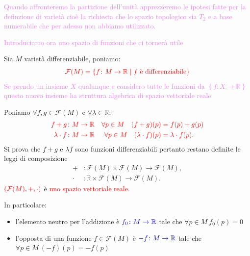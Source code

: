         \textcolor{violet}{Quando affronteremo la partizione dell'unità apprezzeremo le ipotesi fatte per la definzione di varietà
        cioè la richiesta che lo spazio topologico sia $T_2$ e a base numerabile che per adesso non abbiamo utilizzato.}

        \textcolor{violet}{Introduciamo ora uno spazio di funzioni che ci tornerà utile}

        Sia $M$ varietà differenziabile, poniamo:
        \begin{equation}
        \label{eq:spazio_di_funzioni_differenziabili_definite_su_varieta}
        \textcolor{red}{\mathcal{F}(M) = \{ f \colon M \to \mathbb{R} \mid f \text{ è differenziabile} \}}
        \end{equation}
        \textcolor{violet}{Se prendo un insieme $X$ qualunque e considero tutte le funzioni da $\left\{  f \colon X \to \mathbb{R} \right\}$ questo nuovo insieme ha struttura algebrica di spazio vettoriale reale}

        Poniamo $\forall f, g \in \mathcal{F}(M)$ e $\forall \lambda \in \mathbb{R}$:
        \begin{align*}
        \color{red} f + g & \color{red}  \colon M \to \mathbb{R} & \color{red} \forall p \in M \quad (f + g)(p) & \color{red} = f(p) + g(p) \\
        \color{red} \lambda \cdot f & \color{red} \colon M \to \mathbb{R} & \color{red} \forall p \in M \quad (\lambda \cdot f)(p) & \color{red} = \lambda \cdot f(p).
        \end{align*}
        Si prova che $f + g$ e $\lambda f$ sono funzioni differenziabili pertanto restano definite le leggi di composizione
        \begin{align*}
        + &\colon \mathcal{F}(M) \times \mathcal{F}(M) \to \mathcal{F}(M), \\
        \boldsymbol{\cdot} &\colon \mathbb{R} \times \mathcal{F}(M) \to \mathcal{F}(M).
        \end{align*}
        $\textcolor{red}{(\mathcal{F}(M), +, \cdot)}$ è \textcolor{red}{uno spazio vettoriale reale}. 
        
        In particolare:
        \begin{itemize}
            \item l'elemento neutro per l'addizione è $\textcolor{blu}{f_0 \colon M \to \mathbb{R}}$ tale che \textcolor{blu}{$\forall p \in M \ f_0(p) = 0$}
            \item l'opposta di una funzione $f \in \mathcal{F}(M)$ è $\textcolor{blu}{-f \colon M \to \mathbb{R}}$ tale che  \textcolor{blu}{$\forall p \in M \ (-f)(p) = -f(p)$}
        \end{itemize}

